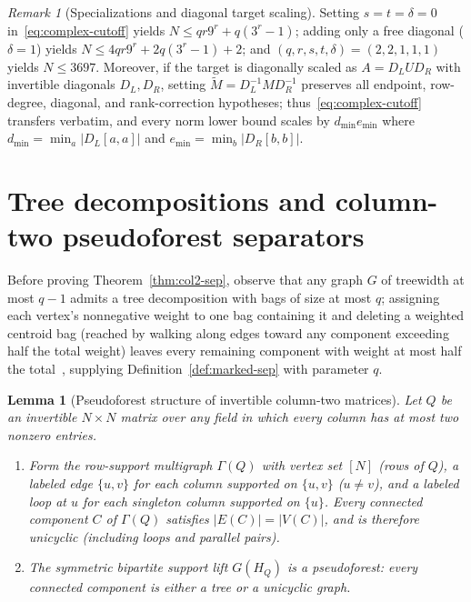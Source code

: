 \documentclass[11pt,reqno]{amsart}
\numberwithin{equation}{section}
\newtheorem{lemma}[theorem]{Lemma}
\theoremstyle{definition}
\theoremstyle{remark}
\newtheorem{remark}[theorem]{Remark}
\begin{document}
\begin{remark}[Specializations and diagonal target scaling]
\label{rem:scaling}
Setting $s=t=\delta=0$ in~\eqref{eq:complex-cutoff} yields $N\le qr 9^r + q(3^r-1)$; adding only a free diagonal ($\delta=1$) yields $N\le 4qr 9^r + 2q(3^r-1) + 2$; and $(q,r,s,t,\delta)=(2,2,1,1,1)$ yields $N\le 3697$. Moreover, if the target is diagonally scaled as $A = D_L U D_R$ with invertible diagonals $D_L,D_R$, setting $\widetilde{M} = D_L^{-1} M D_R^{-1}$ preserves all endpoint, row-degree, diagonal, and rank-correction hypotheses; thus~\eqref{eq:complex-cutoff} transfers verbatim, and every norm lower bound scales by $d_{\min} e_{\min}$ where $d_{\min}=\min_a |D_L[a,a]|$ and $e_{\min}=\min_b |D_R[b,b]|$.
\end{remark}

\section{Tree decompositions and column-two pseudoforest separators}
\label{sec:col2}

Before proving Theorem~\ref{thm:col2-sep}, observe that any graph $G$ of treewidth at most $q-1$ admits a tree decomposition with bags of size at most $q$; assigning each vertex's nonnegative weight to one bag containing it and deleting a weighted centroid bag (reached by walking along edges toward any component exceeding half the total weight) leaves every remaining component with weight at most half the total~\cite[Section~2.1]{BDDFLP16}, supplying Definition~\ref{def:marked-sep} with parameter $q$.

\begin{lemma}[Pseudoforest structure of invertible column-two matrices]
\label{lem:col2-pf}
Let $Q$ be an invertible $N\times N$ matrix over any field in which every column has at most two nonzero entries.
\begin{enumerate}[label=(\alph*),leftmargin=2em]
\item Form the row-support multigraph $\Gamma(Q)$ with vertex set $[N]$ (rows of $Q$), a labeled edge $\{u,v\}$ for each column supported on $\{u,v\}$ ($u\neq v$), and a labeled loop at $u$ for each singleton column supported on $\{u\}$. Every connected component $C$ of $\Gamma(Q)$ satisfies $|E(C)| = |V(C)|$, and is therefore unicyclic (including loops and parallel pairs).
\item The symmetric bipartite support lift $G(H_Q)$ is a pseudoforest: every connected component is either a tree or a unicyclic graph.
\end{enumerate}
\end{lemma}
\end{document}
